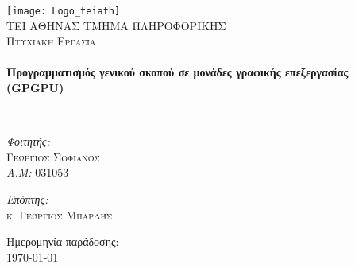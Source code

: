 \begin{titlepage}
\begin{center}

\texttt{[image: Logo\_teiath]}~\\[1cm]

\textsc{\LARGE ΤΕΙ ΑΘΗΝΑΣ ΤΜΗΜΑ ΠΛΗΡΟΦΟΡΙΚΗΣ}\\[1.5cm]

\textsc{\Large Πτυχιακή Εργασία}\\[0.5cm]

\HRule \\[0.4cm]
{ \huge \bfseries Προγραμματισμός γενικού σκοπού σε μονάδες γραφικής επεξεργασίας \\ (GPGPU) \\[0.4cm] }

\HRule \\[1.5cm]

\begin{minipage}[t]{0.4\textwidth}
\begin{flushleft} \large
\emph{Φοιτητής:}\\
\textsc{Γεώργιος Σοφιανός}\\
\emph{A.M:} 031053
\end{flushleft}
\end{minipage}
\begin{minipage}[t]{0.4\textwidth}
\begin{flushright} \large
\emph{Επόπτης:} \\
\textsc{κ. Γεώργιος Μπαρδής}
\end{flushright}
\end{minipage}

\vfill

{\large Ημερομηνία παράδοσης: \\ \today}

\end{center}
\end{titlepage}